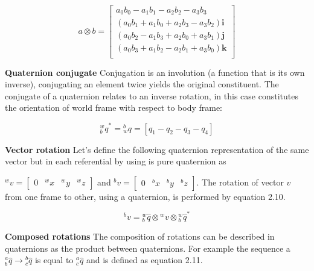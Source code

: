 \begin{equation}
    a \otimes b =
    \begin{bmatrix}
        a_0 b_0 - a_1 b_1 - a_2 b_2 - a_3 b_3                 \\
        (a_0 b_1 + a_1 b_0 + a_2 b_3 - a_3 b_2)\boldsymbol{i} \\
        (a_0 b_2 - a_1 b_3 + a_2 b_0 + a_3 b_1)\boldsymbol{j} \\
        (a_0 b_3 + a_1 b_2 - a_2 b_1 + a_3 b_0)\boldsymbol{k} \\
    \end{bmatrix}
\end{equation}

\item \textbf{Quaternion conjugate} Conjugation is an involution (a function that is its own inverse), conjugating an element twice yields the original constituent. The conjugate of a quaternion relates to an inverse rotation, in this case constitutes the orientation of world frame with respect to body frame:

\begin{equation}
    \textrm{$_{b}^{w}q$}^* =\textrm{$_{w}^{b}q$} = \left[q_1 - q_2 - q_3 - q_4\right]
\end{equation}

\item \textbf{Vector rotation} Let’s define the following quaternion representation of the same vector but in each referential by using is pure quaternion as

$ ^wv = \begin{bmatrix}
        0 & ^wx & ^wy & ^wz
    \end{bmatrix} $
and
$^bv = \begin{bmatrix}
        0 & ^bx & ^by & ^bz
    \end{bmatrix} $. The rotation of vector $v$ from one frame to other, using a quaternion, is performed by equation 2.10.

\begin{equation}
    \textrm{$^{b}v$} = \textrm{$_{b}^{w}\hat{q}$} \otimes \textrm{$^{w}v$} \otimes \textrm{$_{b}^{w}\hat{q}$}^*
\end{equation}

\item \textbf{Composed rotations} The composition of rotations can be described in quaternions as the product between quaternions. For example the sequence a $^a_b\hat{q} \rightarrow {^b_c\hat{q}}$ is equal to $^a_c{\hat{q}}$ and is defined as equation 2.11.


